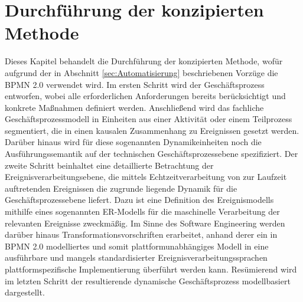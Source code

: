 \chapter{Durchführung der konzipierten Methode}\label{ch:Durchfuehrung}
Dieses Kapitel behandelt die Durchführung der konzipierten Methode, wofür aufgrund der in Abschnitt \ref{sec:Automatisierung} beschriebenen Vorzüge die BPMN 2.0 verwendet wird.
Im ersten Schritt wird der Geschäftsprozess entworfen, wobei alle erforderlichen Anforderungen bereits berücksichtigt und konkrete Maßnahmen definiert werden. 
Anschließend wird das fachliche Geschäftsprozessmodell in Einheiten aus einer Aktivität oder einem Teilprozess segmentiert, die in einen kausalen Zusammenhang zu Ereignissen gesetzt werden. 
Darüber hinaus wird für diese sogenannten Dynamikeinheiten noch die Ausführungssemantik auf der technischen Geschäftsprozessebene spezifiziert.
Der zweite Schritt beinhaltet eine detaillierte Betrachtung der Ereignisverarbeitungsebene, die mittels Echtzeitverarbeitung von zur Laufzeit auftretenden Ereignissen die zugrunde liegende Dynamik für die Geschäftsprozessebene liefert. 
Dazu ist eine Definition des Ereignismodells mithilfe eines sogenannten \ac{ER}-Modells für die maschinelle Verarbeitung der relevanten Ereignisse zweckmäßig. 
Im Sinne des Software Engineering werden darüber hinaus Transformationsvorschriften erarbeitet, anhand derer ein in BPMN 2.0 modelliertes und somit plattformunabhängiges Modell in eine ausführbare und mangels standardisierter Ereignisverarbeitungssprachen plattformspezifische Implementierung überführt werden kann.
Resümierend wird im letzten Schritt der resultierende dynamische Geschäftsprozess modellbasiert dargestellt.



